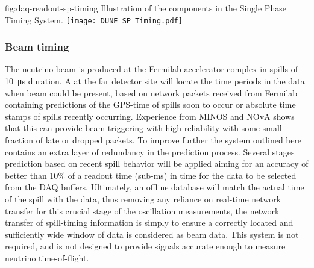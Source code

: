 \begin{dunefigure}{fig:daq-readout-sp-timing}
  {Illustration of the components in the Single Phase Timing System.}
  \texttt{[image: DUNE\_SP\_Timing.pdf]}
\end{dunefigure}

\subsubsection{Beam timing}
\label{sec:fd-daq-design-beamtiming}

The neutrino beam is produced at the Fermilab accelerator complex in
spills of \SI{10}{\us} duration. 
A  at the far detector site will locate the time periods in
the data when beam could be present, based on network packets received
from Fermilab containing predictions of the GPS-time of spills soon to
occur or absolute time stamps of spills recently occurring. 
Experience from MINOS and NOvA shows that this can provide beam
triggering with high reliability with some small fraction of late or
dropped packets.
To improve further the system outlined here contains an extra layer
of redundancy in the prediction process. 
Several stages prediction based on recent spill behavior will be applied aiming
for an accuracy of better than 10\% of a readout
time (sub-\si{\ms}) in time for the data to be selected from
the DAQ buffers. 
Ultimately, an offline database will match the actual time of the
spill with the data, thus removing any reliance on real-time network
transfer for this crucial stage of the oscillation measurements, the
network transfer of spill-timing information is simply to ensure a
correctly located and sufficiently wide window of data is considered
as beam data. This system is not required, and is not designed to
provide signals accurate enough to measure neutrino time-of-flight.

